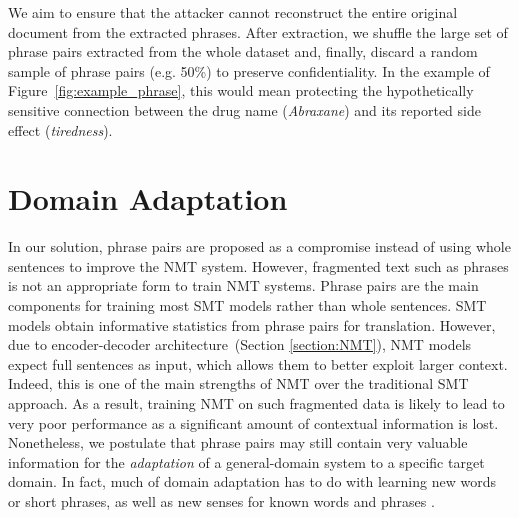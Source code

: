 We aim to ensure that the attacker cannot reconstruct the entire original document from the extracted phrases.
After extraction, we shuffle the large set of phrase pairs extracted from the whole dataset and, finally, discard a random sample of phrase pairs (e.g. 50\%) to preserve confidentiality. 
In the example of Figure~\ref{fig:example_phrase}, this would mean protecting the hypothetically sensitive connection between the drug name (\textit{Abraxane}) and its reported side effect (\textit{tiredness}). 



\section{Domain Adaptation}\label{section:domain_adaptation_nmt}

In our solution, phrase pairs are proposed as a compromise instead of using whole sentences to improve the NMT system. However, fragmented text such as phrases is not an appropriate form to train NMT systems. Phrase pairs are the main components for training most SMT models rather than whole sentences. SMT models obtain informative statistics from phrase pairs for translation. However, due to encoder-decoder architecture~(Section \ref{section:NMT}), NMT models expect full sentences as input, which allows them to better exploit larger context. Indeed, this is one of the main strengths of NMT over the traditional SMT approach.
As a result, training NMT on such fragmented data is likely to lead to very poor performance as a significant amount of contextual information is lost. Nonetheless, we postulate that phrase pairs may still contain very valuable information for the \textit{adaptation} of a general-domain system to a specific target domain. In fact, much of domain adaptation has to do with learning new words or short phrases, as well as new senses for known words and phrases \parencite{irvine-etal-2013-measuring}. 

